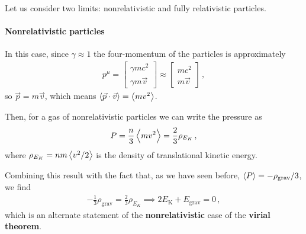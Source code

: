 \documentclass[main.tex]{subfiles}
\begin{document}
Let us consider two limits: nonrelativistic and fully relativistic particles.

\paragraph{Nonrelativistic particles}

In this case, since \(\gamma \approx 1\) the four-momentum of the particles is approximately 
%
\begin{align}
p^{\mu } = \left[\begin{array}{c}
\gamma mc^2 \\ 
\gamma m \vec{v}
\end{array}\right]
\approx \left[\begin{array}{c}
mc^2 \\ 
m \vec{v}
\end{array}\right]
\,,
\end{align}
%
so \(\vec{p} = m \vec{v}\), which means \(\expval{\vec{p} \cdot \vec{v}}  = \expval{ m v^2}\). 


Then, for a gas of nonrelativistic particles we can write the pressure as 
%
\begin{align}
  P = \frac{n}{3} \expval{ m v^2} = \frac{2}{3} \rho_{E_K}
\,,
\end{align}
%
where \(\rho_{E_K} = n m \expval{ v^2 /2}\) is the density of translational kinetic energy.

Combining this result with the fact that, as we have seen before, \(\expval{P}=- \rho _{\text{grav}} / 3\), we find 
%
\begin{align}
  - \frac{1}{3} \rho _{\text{grav}} = \frac{2}{3} \rho_{E_K} \implies
  2 E _{\text{K}} + E _{\text{grav}} = 0
\,,
\end{align}
%
which is an alternate statement of the \textbf{nonrelativistic} case of the \textbf{virial theorem}. 
\end{document}
